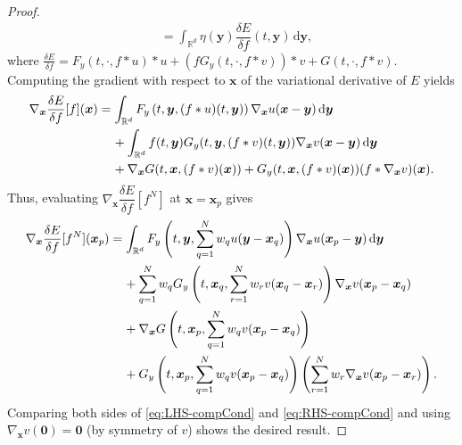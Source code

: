 \documentclass[10pt,a4paper]{amsart}
\newcommand{\bbx}{\bm x}
\newcommand{\rd}{\,\mathrm{d}}
\begin{document}
\begin{proof}
\begin{align*}
        &= \int_{\mathbb{R}^d} \eta(\bm y)\dfrac{\delta E}{\delta f}(t,\bm y) \rd\bm y,
    \end{align*}
    where $\displaystyle \frac{\delta E}{\delta f}=F_y(t,\cdot,f*u)*u+\left(fG_y(t,\cdot,f*v)\right)*v+G(t,\cdot,f*v)$.
    Computing the gradient with respect to $\bm x$ of the variational derivative of $E$ yields\begin{align*}
        \nabla_{\bm x}\frac{\delta E}{\delta f}[f](\bm x) &= \int_{\mathbb{R}^d} F_y\left(t, \bm y, (f*u)(t,\bm y)\right)\nabla_{\bbx}u(\bm x-\bm y) \rd\bm y \\
        &\hskip 4mm+ \int_{\mathbb{R}^d} f(t,\bm y)G_y(t,\bm y,(f*v)(t,\bm y))\nabla_{\bbx} v(\bm x-\bm y)\rd\bm y\\
        &\hskip 4mm+ \nabla_{\bbx} G(t,\bm x,(f*v)(\bm x))+G_y(t,\bm x,(f*v)(\bm x))(f*\nabla_{\bbx} v)(\bm x).
    \end{align*}Thus, evaluating $\nabla_{\bm x}\dfrac{\delta E}{\delta f}[f^N]$ at $\bm x=\bm x_p$ gives
    \begin{align}
        \label{eq:RHS-compCond}
        \nabla_{\bm x}\frac{\delta E}{\delta f}[f^N](\bm x_p) &= \int_{\mathbb{R}^d} F_y\left(t, \bm y, \sum_{q=1}^N w_q u(\bm y-\bm x_q)\right)\nabla_{\bbx}u(\bm x_p-\bm y) \rd\bm y\\
        &\hskip 4mm+ \sum_{q=1}^N w_q G_y\left(t,\bm x_q,\sum_{r=1}^N w_r v(\bm x_q-\bm x_r)\right)\nabla_{\bbx} v(\bm x_p-\bm x_q) \nonumber\\
        &\hskip 4mm+\nabla_{\bbx}G\left(t,\bm x_p,\sum_{q=1}^N w_q v(\bm x_p-\bm x_q)\right)\nonumber\\
        &\hskip 4mm+ G_y\left(t,\bm x_p,\sum_{q=1}^N w_q v(\bm x_p-\bm x_q)\right)\left(\sum_{r=1}^N w_r \nabla_{\bbx} v(\bm x_p-\bm x_r)\right).\nonumber
    \end{align}
 Comparing both sides of \eqref{eq:LHS-compCond} and \eqref{eq:RHS-compCond} and using  $\nabla_{\bbx} v(\bm 0) = \bm 0$ (by symmetry of $v$) shows the desired result.
\end{proof}
\end{document}
